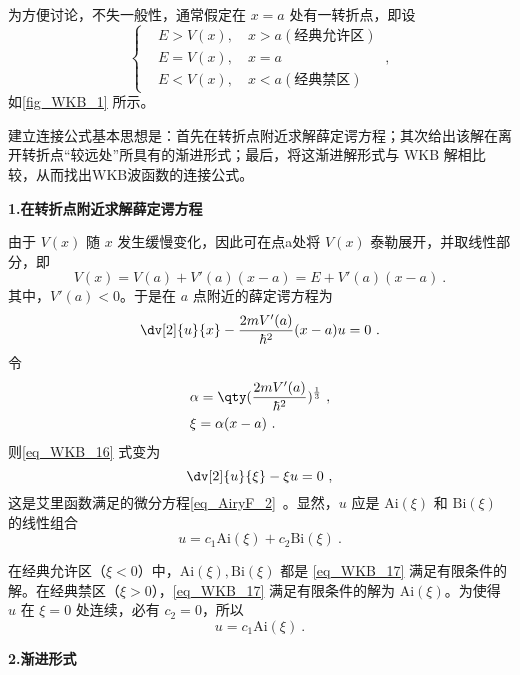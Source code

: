 为方便讨论，不失一般性，通常假定在 $x=a$ 处有一转折点，即设
\begin{equation}
\left\{\begin{aligned}
&E>V(x),\quad x>a(\text{经典允许区})\\
&E=V(x),\quad x=a\\
&E<V(x),\quad x<a(\text{经典禁区})
\end{aligned}~,\right.
\end{equation}
如\autoref{fig_WKB_1} 所示。

建立连接公式基本思想是：首先在转折点附近求解薛定谔方程；其次给出该解在离开转折点“较远处”所具有的渐进形式；最后，将这渐进解形式与 WKB 解相比较，从而找出WKB波函数的连接公式。

\textbf{1.在转折点附近求解薛定谔方程}

由于 $V(x)$ 随 $x$ 发生缓慢变化，因此可在点a处将 $V(x)$ 泰勒展开，并取线性部分，即
\begin{equation}
V(x)=V(a)+V'(a)(x-a)=E+V'(a)(x-a)~.
\end{equation}
 其中，$V'(a)<0$。于是在 $a$ 点附近的薛定谔方程为
 \begin{equation}\label{eq_WKB_16}
 \dv[2]{u}{x}-\frac{2mV'(a)}{\hbar^2}(x-a)u=0~.
 \end{equation}
令
\begin{equation}
\begin{aligned}
&\alpha=\qty(\frac{2mV'(a)}{\hbar^2})^{\frac{1}{3}}~,\\
&\xi=\alpha(x-a)~.
\end{aligned}
\end{equation}
则\autoref{eq_WKB_16} 式变为
\begin{equation}\label{eq_WKB_17}
\dv[2]{u}{\xi}-\xi u=0~,
\end{equation}
这是艾里函数满足的微分方程\autoref{eq_AiryF_2}~。显然，$u$ 应是 $\mathrm{Ai}(\xi)$ 和 $\mathrm{Bi}(\xi)$ 的线性组合
\begin{equation}
u=c_1 \mathrm{Ai}(\xi)+c_2 \mathrm{Bi}(\xi)~.
\end{equation}

在经典允许区（$\xi<0$）中，$\mathrm{Ai}(\xi),\mathrm{Bi}(\xi)$ 都是 \autoref{eq_WKB_17} 满足有限条件的解。在经典禁区（$\xi>0$），\autoref{eq_WKB_17} 满足有限条件的解为 $\mathrm{Ai}(\xi)$。为使得 $u$ 在 $\xi=0$ 处连续，必有 $c_2=0$，所以
\begin{equation}\label{eq_WKB_18}
u=c_1\mathrm{Ai}(\xi)~.
\end{equation}

\textbf{2.渐进形式}

